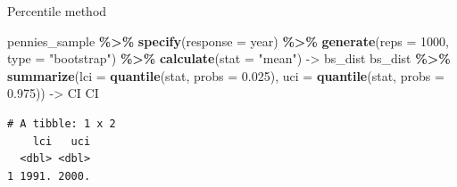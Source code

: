 \documentclass[
  ignorenonframetext,
]{beamer}
\newenvironment{Shaded}{\begin{snugshade}}{\end{snugshade}}
\newcommand{\AttributeTok}[1]{\textcolor[rgb]{0.13,0.29,0.53}{#1}}
\newcommand{\DecValTok}[1]{\textcolor[rgb]{0.00,0.00,0.81}{#1}}
\newcommand{\FloatTok}[1]{\textcolor[rgb]{0.00,0.00,0.81}{#1}}
\newcommand{\FunctionTok}[1]{\textcolor[rgb]{0.13,0.29,0.53}{\textbf{#1}}}
\newcommand{\NormalTok}[1]{#1}
\newcommand{\OtherTok}[1]{\textcolor[rgb]{0.56,0.35,0.01}{#1}}
\newcommand{\SpecialCharTok}[1]{\textcolor[rgb]{0.81,0.36,0.00}{\textbf{#1}}}
\newcommand{\StringTok}[1]{\textcolor[rgb]{0.31,0.60,0.02}{#1}}
\begin{document}
\begin{frame}[fragile]{Percentile method}
\protect\hypertarget{percentile-method}{}
\small

\begin{Shaded}
\begin{Highlighting}[]
\NormalTok{pennies\_sample }\SpecialCharTok{\%\textgreater{}\%} 
  \FunctionTok{specify}\NormalTok{(}\AttributeTok{response =}\NormalTok{ year) }\SpecialCharTok{\%\textgreater{}\%} 
  \FunctionTok{generate}\NormalTok{(}\AttributeTok{reps =} \DecValTok{1000}\NormalTok{, }\AttributeTok{type =} \StringTok{"bootstrap"}\NormalTok{) }\SpecialCharTok{\%\textgreater{}\%} 
  \FunctionTok{calculate}\NormalTok{(}\AttributeTok{stat =} \StringTok{"mean"}\NormalTok{) }\OtherTok{{-}\textgreater{}}\NormalTok{ bs\_dist}
\NormalTok{bs\_dist }\SpecialCharTok{\%\textgreater{}\%} 
  \FunctionTok{summarize}\NormalTok{(}\AttributeTok{lci =} \FunctionTok{quantile}\NormalTok{(stat, }\AttributeTok{probs =} \FloatTok{0.025}\NormalTok{), }
            \AttributeTok{uci =} \FunctionTok{quantile}\NormalTok{(stat, }\AttributeTok{probs =} \FloatTok{0.975}\NormalTok{)) }\OtherTok{{-}\textgreater{}}\NormalTok{ CI}
\NormalTok{CI}
\end{Highlighting}
\end{Shaded}

\begin{verbatim}
# A tibble: 1 x 2
    lci   uci
  <dbl> <dbl>
1 1991. 2000.
\end{verbatim}

\normalsize
\end{frame}
\end{document}
